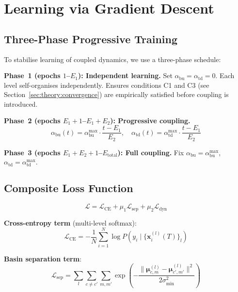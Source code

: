 \documentclass[11pt,a4paper]{article}
\begin{document}
\section{Learning via Gradient Descent}

\subsection{Three-Phase Progressive Training}

To stabilise learning of coupled dynamics, we use a three-phase schedule:

\textbf{Phase~1 (epochs $1$--$E_1$): Independent learning.}
Set $\alpha_{\mathrm{bu}} = \alpha_{\mathrm{td}} = 0$. Each level self-organises
independently. Ensures conditions C1 and C3 (see Section~\ref{sec:theory:convergence}) are
empirically satisfied before coupling is introduced.

\textbf{Phase~2 (epochs $E_1+1$--$E_1+E_2$): Progressive coupling.}
\begin{equation}
  \alpha_{\mathrm{bu}}(t) = \alpha_{\mathrm{bu}}^{\max} \cdot \frac{t - E_1}{E_2},
  \quad
  \alpha_{\mathrm{td}}(t) = \alpha_{\mathrm{td}}^{\max} \cdot \frac{t - E_1}{E_2}
\end{equation}

\textbf{Phase~3 (epochs $E_1+E_2+1$--$E_{\mathrm{total}}$): Full coupling.}
Fix $\alpha_{\mathrm{bu}} = \alpha_{\mathrm{bu}}^{\max}$,
$\alpha_{\mathrm{td}} = \alpha_{\mathrm{td}}^{\max}$.

\subsection{Composite Loss Function}

\begin{equation}
  \mathcal{L} = \mathcal{L}_{\mathrm{CE}} + \mu_1 \mathcal{L}_{\mathrm{sep}} + \mu_2 \mathcal{L}_{\mathrm{dyn}}
\label{eq:loss}
\end{equation}

\textbf{Cross-entropy term} (multi-level softmax):
\begin{equation}
  \mathcal{L}_{\mathrm{CE}} = -\frac{1}{N} \sum_{i=1}^{N} \log P(y_i \mid \{\mathbf{x}_i^{(l)}(T)\}_l)
\end{equation}

\textbf{Basin separation term}:
\begin{equation}
  \mathcal{L}_{\mathrm{sep}} = \sum_{l} \sum_{c \ne c'} \sum_{m,m'}
    \exp\!\left(-\frac{\|\boldsymbol{\mu}^{(l)}_{c,m} - \boldsymbol{\mu}^{(l)}_{c',m'}\|^2}
                       {2\sigma^2_{\min}}\right)
\end{equation}
\end{document}
